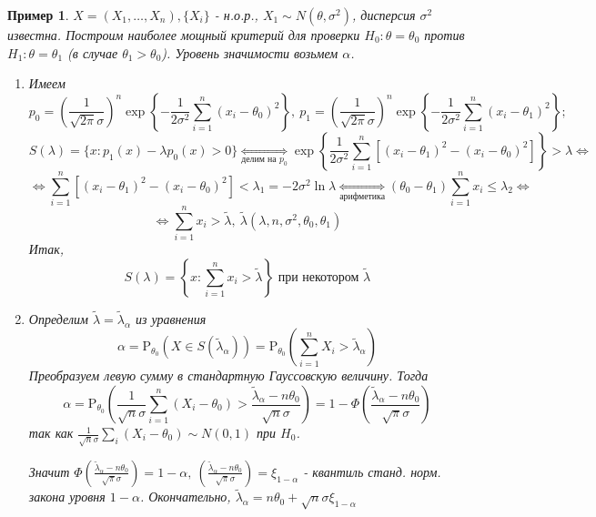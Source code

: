 \documentclass[12pt]{article}
\newtheorem*{example}{Пример}
\theoremstyle{basic_theorem}
\theoremstyle{name_theorem}
\def\P{ \mathrm{P} }
\begin{document}
\begin{example}
    \(X = (X_1,\ldots, X_n), \{X_i\}\) - н.о.р., \(X_1 \sim N(\theta, \sigma^2)\),
    дисперсия \(\sigma^2\) известна. Построим наиболее мощный критерий
    для проверки \(H_0: \theta = \theta_0\) против \(H_1: \theta = \theta_1\)
    (в случае \(\theta_1 > \theta_0\)). Уровень значимости возьмем \(\alpha\).
    \begin{enumerate}
        \item Имеем
        \[p_0 = \left(\frac{1}{\sqrt{2\pi}\sigma}\right)^n \exp{\left\{-\frac{1}{2\sigma^2} \sum^n_{i=1} (x_i -\theta_0)^2\right\}},\
        p_1 = \left(\frac{1}{\sqrt{2\pi}\sigma}\right)^n \exp{\left\{-\frac{1}{2\sigma^2} \sum^n_{i=1} (x_i -\theta_1)^2\right\}};\]
        \[S(\lambda) = \{x:p_1(x) - \lambda p_0(x) > 0\} \underset{\text{делим на }p_0}{\Leftrightarrow}
        \exp{\left\{\frac{1}{2\sigma^2}\sum_{i=1}^n\left[ (x_i-\theta_1)^2 -(x_i-\theta_0)^2 \right]\right\}} > \lambda\Leftrightarrow\]
        \[\Leftrightarrow \sum_{i=1}^n\left[(x_i - \theta_1)^2 - (x_i - \theta_0)^2\right] < \lambda_1 = -2\sigma^2\ln\lambda
        \underset{\text{арифметика}}{\Leftrightarrow} (\theta_0 - \theta_1)\sum_{i=1}^n x_i \leq\lambda_2 \Leftrightarrow\]
        \[\Leftrightarrow \sum_{i=1}^n x_i > \widetilde{\lambda},\ \widetilde{\lambda}(\lambda, n, \sigma^2, \theta_0, \theta_1)\]
        Итак,
        \[S(\lambda) = \left\{x: \sum_{i=1}^n x_i > \widetilde{\lambda}\right\} \text{ при некотором } \widetilde{\lambda}\]

        \item Определим \(\widetilde{\lambda} = \widetilde{\lambda}_\alpha\)
            из уравнения
            \[\alpha = \P_{\theta_0}(X \in S(\widetilde{\lambda}_\alpha)) =
            \P_{\theta_0}\left(\sum_{i=1}^n X_i > \widetilde{\lambda}_\alpha\right)\]
            Преобразуем левую сумму в стандартную Гауссовскую величину. Тогда
            \[\alpha = \P_{\theta_0}\left(\frac{1}{\sqrt{n} \sigma} \sum_{i=1}^n(X_i - \theta_0) > \frac{\widetilde{\lambda}_\alpha - n\theta_0}{\sqrt{n}\sigma}\right)=
            1 - \Phi\left(\frac{\widetilde{\lambda}_\alpha - n\theta_0}{\sqrt{\pi}\sigma}\right)\]
            так как \(\frac{1}{\sqrt{n}\sigma}\sum_{i} (X_i - \theta_0) \sim N(0, 1)\) при \(H_0\).

            Значит $\Phi\left(\frac{\widetilde{\lambda}_\alpha - n\theta_0}{\sqrt{\pi}\sigma}\right) = 1 - \alpha,\
            \left(\frac{\widetilde{\lambda}_\alpha - n\theta_0}{\sqrt{\pi}\sigma}\right) = \xi_{1-\alpha}$
             - квантиль станд. норм. закона уровня \(1 - \alpha\).
            Окончательно, \(\widetilde{\lambda}_\alpha = n\theta_0 + \sqrt{n}\sigma \xi_{1-\alpha}\)


\end{enumerate}
\end{example}
\end{document}
